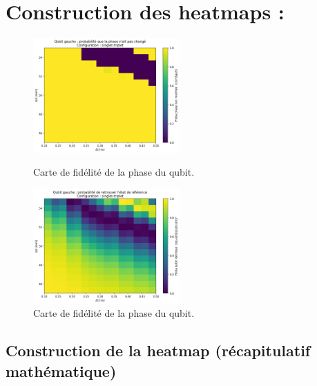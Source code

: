 \documentclass{article}
\begin{document}

\section*{Construction des heatmaps :}
\begin{figure}[H]
  \centering
  \begin{minipage}[c]{0.6\textwidth}
    \centering
    \includegraphics[width=0.5\textwidth]{qubit_results/singlet-triplet__p_si0_15_15/images/15x15__singlet-triplet__qubit/p_nochange_map_qubit_left_singlet-triplet_15x15_20250821-041033.png}
    \caption{Carte de fidélité de la phase du qubit.}
    \label{fig:fidelity_map_1}
  \end{minipage}\hfill
  \begin{minipage}[c]{0.6\textwidth}
    \centering
    \includegraphics[width=0.5\textwidth]{qubit_results/singlet-triplet__p_si0_15_15/images/15x15__singlet-triplet__qubit/p_qubit_overlap_map_left_15x15_20250821-032340.png}
    \caption{Carte de fidélité de la phase du qubit.}
    \label{fig:fidelity_map_detector}
  \end{minipage}
\end{figure}

\subsection*{Construction de la heatmap (récapitulatif mathématique)}
\end{document}
